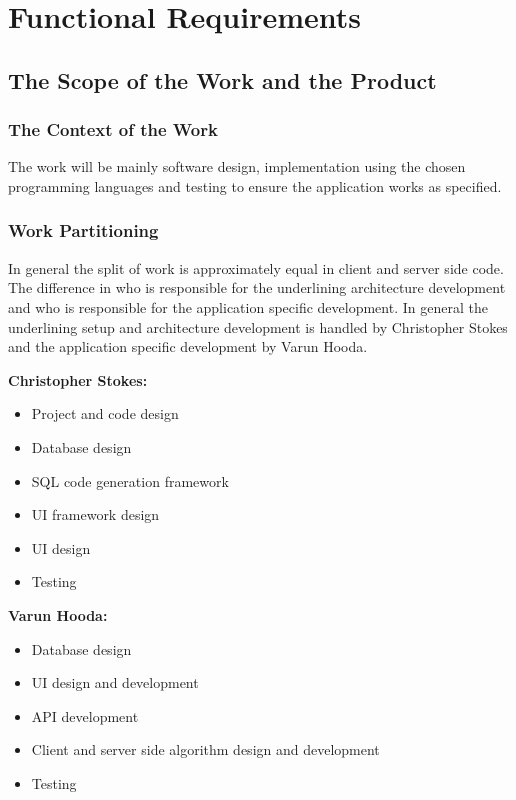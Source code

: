 \documentclass[12pt, titlepage]{article}
\begin{document}
\section{Functional Requirements}

  \subsection{The Scope of the Work and the Product}

    \subsubsection{The Context of the Work}
		The work will be mainly software design, implementation using the chosen
		programming languages and testing to ensure the application works as
		specified.

    \subsubsection{Work Partitioning}
		In general the split of work is approximately equal in client and server
		side code. The difference in who is responsible for the underlining
		architecture development and who is responsible for the application
		specific development. In general the underlining setup and architecture
		development is handled by Christopher Stokes and the application specific
		development by Varun Hooda.

    \textbf{Christopher Stokes:}
    \begin{itemize}
        \item Project and code design
        \item Database design
        \item SQL code generation framework
        \item UI framework design
        \item UI design
        \item Testing
    \end{itemize}


    \textbf{Varun Hooda:}
    \begin{itemize}
        \item Database design
        \item UI design and development
        \item API development
        \item Client and server side algorithm design and development
        \item Testing
    \end{itemize}
\end{document}
